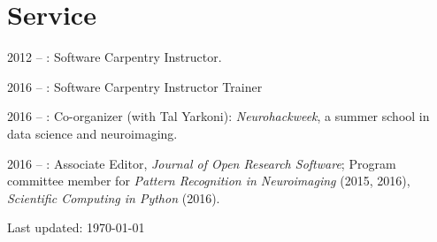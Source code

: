 \documentclass[11pt,fullpage]{article}
\begin{document}
\vspace{-2mm}
\section*{Service}
\vspace{-2mm}
2012 -- : Software Carpentry Instructor.

2016 -- : Software Carpentry Instructor Trainer

2016 -- : Co-organizer (with Tal Yarkoni): \emph{Neurohackweek}, a summer school in data science and neuroimaging.

2016 -- : Associate Editor, \emph{Journal of Open Research Software}; Program committee member for \emph{Pattern Recognition in Neuroimaging} (2015, 2016), \emph{Scientific Computing in Python} (2016).

\bigskip
\begin{center}
  \begin{footnotesize}
    Last updated: \today
  \end{footnotesize}
\end{center}

\end{document}
